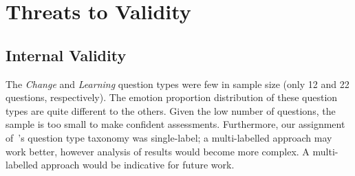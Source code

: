 


\section{Threats to Validity}\label{semotion2020:sec:threats}

\subsection{Internal Validity} 
The \textit{ Change} and \textit{Learning} question types were few in sample size (only 12 and 22 questions, respectively). The emotion  proportion distribution of these question types are  quite different to the others.  Given the low number of questions, the sample is too small to make confident assessments. Furthermore, our assignment of~\citeauthor{Beyer:2018fm}'s question type taxonomy was single-label; a multi-labelled approach may work better, however analysis of results would become more complex. A multi-labelled approach would be indicative for future work.

